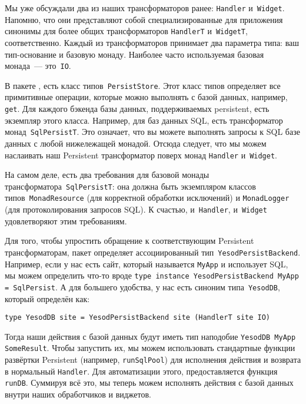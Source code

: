 Мы уже обсуждали два из наших трансформаторов ранее: \lstinline'Handler'
и~\lstinline'Widget'. Напомню, что они представляют собой специализированные
для приложения синонимы для более общих трансформаторов \lstinline'HandlerT'
и~\lstinline'WidgetT', соответственно. Каждый из трансформаторов принимает два
параметра типа: ваш тип-основание и базовую монаду. Наиболее часто используемая
базовая монада~--- это~\lstinline'IO'.

В пакете
, есть
класс типов~\lstinline'PersistStore'. Этот класс типов определяет все
примитивные операции, которые можно выполнять с базой данных, например,
\lstinline'get'. Для каждого бэкенда базы данных, поддерживаемых persistent,
есть экземпляр этого класса. Например, для баз данных SQL, есть трансформатор
монад~\lstinline'SqlPersistT'. Это означает, что вы можете выполнять запросы к
SQL базе данных с любой нижележащей монадой. Отсюда следует, что мы можем
наслаивать наш Persistent трансформатор поверх монад \lstinline'Handler'
и~\lstinline'Widget'.

\begin{remark}
    На самом деле, есть два требования для базовой монады
    трансформатора~\lstinline'SqlPersistT': она должна быть экземпляром классов
    типов~\lstinline'MonadResource' (для корректной обработки исключений) и
    \lstinline'MonadLogger' (для протоколирования запросов SQL). К счастью,
    и~\lstinline'Handler', и~\lstinline'Widget' удовлетворяют этим требованиям.
\end{remark}

Для того, чтобы упростить обращение к соответствующим Persistent
трансформаторам, пакет
определяет ассоциированный тип~\lstinline'YesodPersistBackend'. Например, если у
нас есть сайт, который называется \lstinline'MyApp' и использует SQL, мы можем
определить что-то вроде
\lstinline'type instance YesodPersistBackend MyApp = SqlPersist'. А для
большего удобства, у нас есть синоним типа~\lstinline'YesodDB', который
определён как:
\begin{lstlisting}
type YesodDB site = YesodPersistBackend site (HandlerT site IO)
\end{lstlisting}

Тогда наши действия с базой данных будут иметь тип наподобие
\lstinline'YesodDB MyApp SomeResult'. Чтобы запустить их, мы можем использовать
стандартные функции развёртки Persistent (например, \lstinline'runSqlPool') для
исполнения действия и возврата в нормальный \lstinline'Handler'. Для
автоматизации этого, предоставляется функция \lstinline'runDB'. Суммируя всё
это, мы теперь можем исполнять действия с базой данных внутри наших
обработчиков и виджетов.


